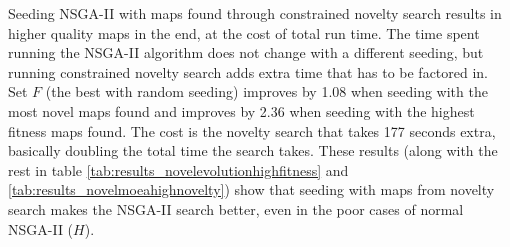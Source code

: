 \begin{table}[!h]
	\begin{center}
	\renewcommand{\arraystretch}{1}
	\caption{Results of NSGA-II seeded with highest novelty novel individuals.}
	\label{tab:results_novelmoeahighnovelty}
	\end{center}
\end{table}

Seeding NSGA-II with maps found through constrained novelty search results in higher quality maps in the end, at the cost of total run time. The time spent running the NSGA-II algorithm does not change with a different seeding, but running constrained novelty search adds extra time that has to be factored in. Set $F$ (the best with random seeding) improves by 1.08 when seeding with the most novel maps found and improves by 2.36 when seeding with the highest fitness maps found. The cost is the novelty search that takes 177 seconds extra, basically doubling the total time the search takes. These results (along with the rest in table \ref{tab:results_novelevolutionhighfitness} and \ref{tab:results_novelmoeahighnovelty}) show that seeding with maps from novelty search makes the NSGA-II search better, even in the poor cases of normal NSGA-II ($H$).

